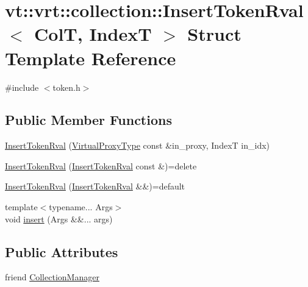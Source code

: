 \hypertarget{structvt_1_1vrt_1_1collection_1_1_insert_token_rval}{}\section{vt\+:\+:vrt\+:\+:collection\+:\+:Insert\+Token\+Rval$<$ ColT, IndexT $>$ Struct Template Reference}
\label{structvt_1_1vrt_1_1collection_1_1_insert_token_rval}


{\ttfamily \#include $<$token.\+h$>$}

\subsection*{Public Member Functions}
\begin{DoxyCompactItemize}
\item 
\hyperlink{structvt_1_1vrt_1_1collection_1_1_insert_token_rval_a346da7d8d739227c8918399c43095e16}{Insert\+Token\+Rval} (\hyperlink{namespacevt_a1b417dd5d684f045bb58a0ede70045ac}{Virtual\+Proxy\+Type} const \&in\+\_\+proxy, IndexT in\+\_\+idx)
\item 
\hyperlink{structvt_1_1vrt_1_1collection_1_1_insert_token_rval_aea48b21e03ac5cab59b9e470af56f8c6}{Insert\+Token\+Rval} (\hyperlink{structvt_1_1vrt_1_1collection_1_1_insert_token_rval}{Insert\+Token\+Rval} const \&)=delete
\item 
\hyperlink{structvt_1_1vrt_1_1collection_1_1_insert_token_rval_ad7bd979f47256df2d3357e2232ca23c2}{Insert\+Token\+Rval} (\hyperlink{structvt_1_1vrt_1_1collection_1_1_insert_token_rval}{Insert\+Token\+Rval} \&\&)=default
\item 
{\footnotesize template$<$typename... Args$>$ }\\void \hyperlink{structvt_1_1vrt_1_1collection_1_1_insert_token_rval_a24233cafaa4d9a311c757573e3a61352}{insert} (Args \&\&... args)
\end{DoxyCompactItemize}
\subsection*{Public Attributes}
\begin{DoxyCompactItemize}
\item 
friend \hyperlink{structvt_1_1vrt_1_1collection_1_1_insert_token_rval_a10b822803e1ad9860efabbb9d979c842}{Collection\+Manager}
\end{DoxyCompactItemize}


